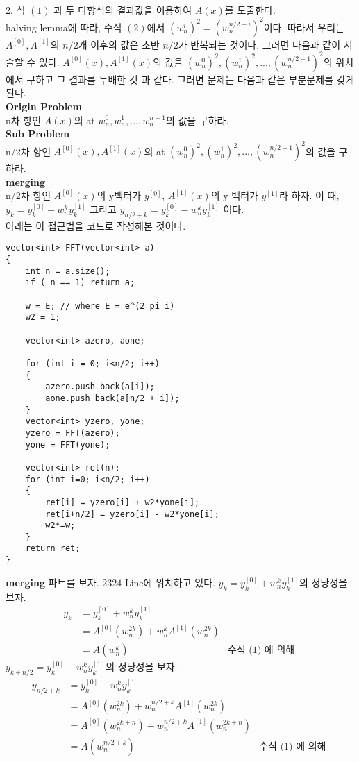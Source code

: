 \documentclass{article}
\begin{document}
\\
2. 식 $(1)$ 과 두 다항식의 결과값을 이용하여 $A(x)$를 도출한다. 
\\
halving lemma에 따라, 수식 $(2)$에서 $(w_n^i)^2 = (w_n^{n/2+i})^2$이다. 
따라서 우리는 $A^{[0]}, A^{[1]}$의 $n/2$개 이후의 값은 초반 $n/2$가 반복되는 것이다.
그러면 다음과 같이 서술할 수 있다. $A^{[0]}(x), A^{[1]}(x)$의 값을 $(w_n^0)^2, (w_n^1)^2, ... , (w_n^{n/2-1})^2$의 위치에서 구하고 
그 결과를 두배한 것 과 같다. 그러면 문제는 다음과 같은 부분문제를 갖게된다. 
\\
\textbf{Origin Problem}
\\
n차 항인 $A(x)$의 at $w_n^0, w_n^1, ... , w_n^{n-1}$의 값을 구하라. 
\\
\textbf{Sub Problem}
\\
n/2차 항인 $A^{[0]}(x), A^{[1]}(x)$의 at $(w_n^0)^2, (w_n^1)^2, ... , (w_n^{n/2-1})^2$의 값을 구하라.
\\
\textbf{merging}
\\
n/2차 항인 $A^{[0]}(x)$의 y벡터가 $y^{[0]}$, $A^{[1]}(x)$의 y 벡터가 $y^{[1]}$라 하자. 
이 때, $y_k = y_k^{[0]} + w_n^k y_k^{[1]}$ 그리고 $y_{n/2+k} = y_k^{[0]} - w_n^k y_k^{[1]}$ 이다. 
\pagebreak
\\
아래는 이 접근법을 코드로 작성해본 것이다. 
\begin{lstlisting}
vector<int> FFT(vector<int> a)
{
    int n = a.size();
    if ( n == 1) return a;

    w = E; // where E = e^(2 pi i)
    w2 = 1;

    vector<int> azero, aone;

    for (int i = 0; i<n/2; i++)
    {
        azero.push_back(a[i]);
        aone.push_back(a[n/2 + i]);
    }
    vector<int> yzero, yone;
    yzero = FFT(azero);
    yone = FFT(yone);

    vector<int> ret(n);
    for (int i=0; i<n/2; i++)
    {
        ret[i] = yzero[i] + w2*yone[i];
        ret[i+n/2] = yzero[i] - w2*yone[i];
        w2*=w;
    }
    return ret;
}
\end{lstlisting}
\textbf{merging} 파트를 보자. $23 \tilde 24$ Line에 위치하고 있다. 
$y_k = y_k^{[0]} + w_n^k y_k^{[1]}$의 정당성을 보자. 
\begin{align*}
    y_k &= y_k^{[0]} + w_n^k y_k^{[1]}\\
    &=A^{[0]}(w_n^{2k}) + w_n^kA^{[1]}(w_n^{2k})\\
    &=A(w_n^k) &\text{수식 (1) 에 의해 }
\end{align*}
$y_{k+n/2} = y_k^{[0]} - w_n^k y_k^{[1]}$의 정당성을 보자. 
\begin{align*}
    y_{n/2+k} &= y_k^{[0]} - w_n^k y_k^{[1]}\\
    &=A^{[0]}(w_n^{2k}) + w_n^{n/2+k}A^{[1]}(w_n^{2k})\\
    &=A^{[0]}(w_n^{2k+n}) + w_n^{n/2+k}A^{[1]}(w_n^{2k+n})\\
    &=A(w_n^{n/2+k}) &\text{수식 (1) 에 의해 }
\end{align*}
\pagebreak
\end{document}

